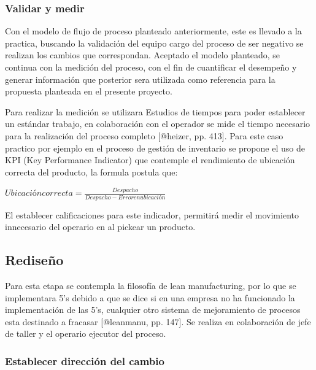\documentclass[
]{article}
\begin{document}
\hypertarget{validar-y-medir}{%
\subsubsection{Validar y medir}\label{validar-y-medir}}

Con el modelo de flujo de proceso planteado anteriormente, este es
llevado a la practica, buscando la validación del equipo cargo del
proceso de ser negativo se realizan los cambios que correspondan.
Aceptado el modelo planteado, se continua con la medición del proceso,
con el fin de cuantificar el desempeño y generar información que
posterior sera utilizada como referencia para la propuesta planteada en
el presente proyecto.

Para realizar la medición se utilizara Estudios de tiempos para poder
establecer un estándar trabajo, en colaboración con el operador se mide
el tiempo necesario para la realización del proceso completo {[}@heizer,
pp. 413{]}. Para este caso practico por ejemplo en el proceso de gestión
de inventario se propone el uso de KPI (Key Performance Indicator) que
contemple el rendimiento de ubicación correcta del producto, la formula
postula que:

\begin{center}
$Ubicacióncorrecta = \frac{Despacho}{Despacho-Error en ubicación}$
\end{center}

El establecer calificaciones para este indicador, permitirá medir el
movimiento innecesario del operario en al pickear un producto.

\hypertarget{rediseuxf1o}{%
\subsection{Rediseño}\label{rediseuxf1o}}

Para esta etapa se contempla la filosofía de lean manufacturing, por lo
que se implementara 5's debido a que se dice si en una empresa no ha
funcionado la implementación de las 5's, cualquier otro sistema de
mejoramiento de procesos esta destinado a fracasar {[}@leanmanu, pp.
147{]}. Se realiza en colaboración de jefe de taller y el operario
ejecutor del proceso.

\hypertarget{establecer-direcciuxf3n-del-cambio}{%
\subsubsection{Establecer dirección del
cambio}\label{establecer-direcciuxf3n-del-cambio}}
\end{document}
